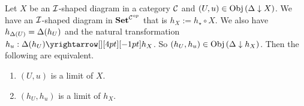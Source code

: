 \begin{prop}
  
  
\end{prop}

\begin{prop}\label{set_complete}
  
\end{prop}

\begin{prop}\label{top_complete}
  
\end{prop}

\begin{prop}\label{grp_complete}
  
\end{prop}

\begin{prop}\label{ring_complete}
  
\end{prop}

\begin{prop}\label{mod_complete}
  
\end{prop}

\begin{prop}
  
  Let $X$ be an $\mathcal{I}$-shaped diagram in a category $\mathcal{C}$ and 
  $(U,u) \in \mathrm{Obj}\left(\Delta\downarrow X\right)$. 
  We have an $\mathcal{I}$-shaped diagram in $\mathbf{Set}^{\mathcal{C}^{op}}$ 
  that is $h_X := h_{\star} \circ X$. 
  We also have $h_{\Delta(U)} = \Delta(h_U)$ and 
  the natural transformation $h_u : \map{\De(h_U)}{h_X}{}{}$. 
  So $(h_U,h_u) \in \mathrm{Obj}\left(\Delta\downarrow h_X\right)$.
  Then the following are equivalent. 
  \begin{enumerate}
    \item $(U,u)$ is a limit of $X$. 
    \item $(h_U,h_u)$ is a limit of $h_X$.
  \end{enumerate}
\end{prop}

\begin{cor}\label{cts}
  
\end{cor}

\begin{dfn}\label{filtered}
  
\end{dfn}

\begin{prop}
  \label{filtered_colimits_commute}
  
\end{prop}